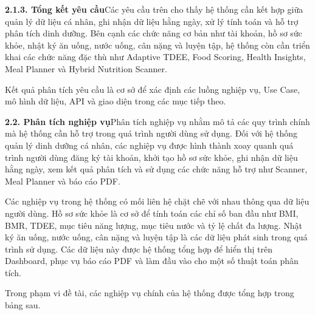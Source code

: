 \textbf{2.1.3. Tổng kết yêu cầu}Các yêu cầu trên cho thấy hệ thống cần kết hợp giữa quản lý dữ liệu cá nhân, ghi nhận dữ liệu hằng ngày, xử lý tính toán và hỗ trợ phân tích dinh dưỡng. Bên cạnh các chức năng cơ bản như tài khoản, hồ sơ sức khỏe, nhật ký ăn uống, nước uống, cân nặng và luyện tập, hệ thống còn cần triển khai các chức năng đặc thù như Adaptive TDEE, Food Scoring, Health Insights, Meal Planner và Hybrid Nutrition Scanner.

Kết quả phân tích yêu cầu là cơ sở để xác định các luồng nghiệp vụ, Use Case, mô hình dữ liệu, API và giao diện trong các mục tiếp theo.

\textbf{2.2. Phân tích nghiệp vụ}Phân tích nghiệp vụ nhằm mô tả các quy trình chính mà hệ thống cần hỗ trợ trong quá trình người dùng sử dụng. Đối với hệ thống quản lý dinh dưỡng cá nhân, các nghiệp vụ được hình thành xoay quanh quá trình người dùng đăng ký tài khoản, khởi tạo hồ sơ sức khỏe, ghi nhận dữ liệu hằng ngày, xem kết quả phân tích và sử dụng các chức năng hỗ trợ như Scanner, Meal Planner và báo cáo PDF.

Các nghiệp vụ trong hệ thống có mối liên hệ chặt chẽ với nhau thông qua dữ liệu người dùng. Hồ sơ sức khỏe là cơ sở để tính toán các chỉ số ban đầu như BMI, BMR, TDEE, mục tiêu năng lượng, mục tiêu nước và tỷ lệ chất đa lượng. Nhật ký ăn uống, nước uống, cân nặng và luyện tập là các dữ liệu phát sinh trong quá trình sử dụng. Các dữ liệu này được hệ thống tổng hợp để hiển thị trên Dashboard, phục vụ báo cáo PDF và làm đầu vào cho một số thuật toán phân tích.

Trong phạm vi đề tài, các nghiệp vụ chính của hệ thống được tổng hợp trong bảng sau.

